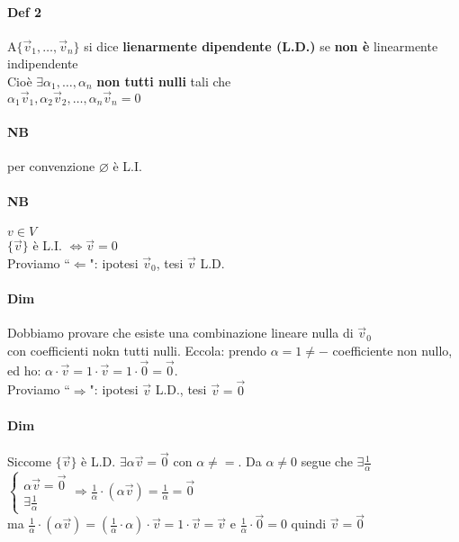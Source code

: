 \paragraph{Def 2} A$\{\vec{v}_1,\dots, \vec{v}_n\}$ si dice 
\textbf{lienarmente dipendente (L.D.)} se \textbf{non è} linearmente indipendente\\
Cioè $\exists \alpha_1,\dots, \alpha_n$ \textbf{non tutti nulli} tali che \\
$\alpha_1\vec{v}_1, \alpha_2\vec{v}_2,\dots, \alpha_n\vec{v}_n=0$\\

\paragraph{NB} per convenzione $\varnothing$ è L.I.
\paragraph{NB} $v\in V$\\
$\{\vec{v}\}$ è L.I. $\Longleftrightarrow \vec{v}=0$\\
Proviamo ``$\Longleftarrow$": ipotesi $\vec{v}_0$, tesi $\vec{v}$ L.D.\\
\paragraph{Dim} Dobbiamo provare che esiste una combinazione lineare nulla di $\vec{v}_0$\\
con coefficienti nokn tutti nulli. Eccola: prendo $\alpha=1\neq - $ coefficiente non nullo, 
ed ho: $\alpha \cdot \vec{v}=1\cdot \vec{v}= 1\cdot\vec{0} = \vec{0}$.\\
Proviamo ``$\Longrightarrow$": ipotesi $\vec{v}$ L.D., tesi $\vec{v}=\vec{0}$
\paragraph{Dim} Siccome $\{\vec{v}\}$ è L.D. $\exists\alpha\vec{v}=\vec{0}$ con 
$\alpha\neq =$. Da $\alpha\neq 0$ segue che $\exists\frac{1}{\alpha}$\\
$ 
\begin{cases}
    \alpha\vec{v}=\vec{0}\\
    \exists\frac{1}{\alpha}
\end{cases}
\Longrightarrow\frac{1}{\alpha}\cdot(\alpha\vec{v})=\frac{1}{\alpha}=\vec{0}
$\\
ma  
$ 
\frac{1}{\alpha} \cdot(\alpha\vec{v})=(\frac{1}{\alpha}\cdot \alpha)\cdot \vec{v}
=1\cdot{\vec{v}}= \vec{v}
$ e $ 
\frac{1}{\alpha}\cdot\vec{0}=0$ quindi $\vec{v}=\vec{0}$

